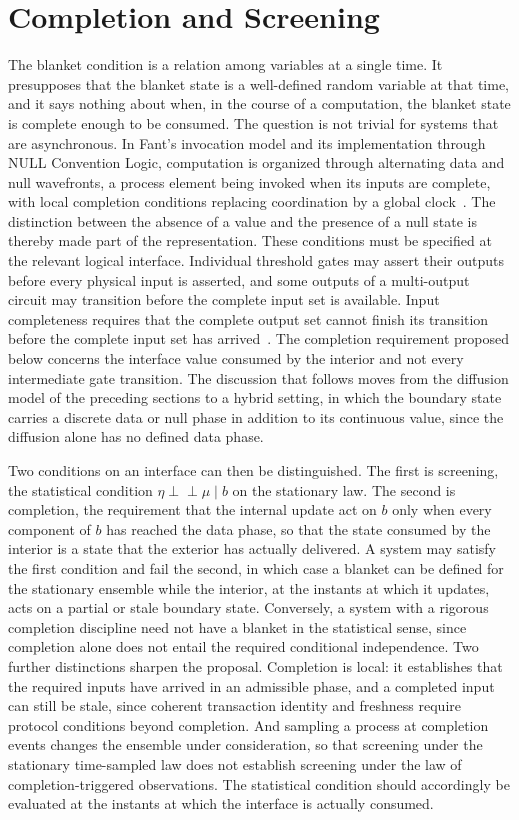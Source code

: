 \documentclass[11pt]{article}
\theoremstyle{definition}
\newcommand{\Ind}{\perp\!\!\!\perp}
\begin{document}
\section{Completion and Screening}

The blanket condition is a relation among variables at a single time. It presupposes that the blanket state is a well-defined random variable at that time, and it says nothing about when, in the course of a computation, the blanket state is complete enough to be consumed. The question is not trivial for systems that are asynchronous. In Fant's invocation model and its implementation through NULL Convention Logic, computation is organized through alternating data and null wavefronts, a process element being invoked when its inputs are complete, with local completion conditions replacing coordination by a global clock~\cite{fant2005,fant2007}. The distinction between the absence of a value and the presence of a null state is thereby made part of the representation. These conditions must be specified at the relevant logical interface. Individual threshold gates may assert their outputs before every physical input is asserted, and some outputs of a multi-output circuit may transition before the complete input set is available. Input completeness requires that the complete output set cannot finish its transition before the complete input set has arrived~\cite[Section~2.2, p.~174]{ponugoti2022}. The completion requirement proposed below concerns the interface value consumed by the interior and not every intermediate gate transition. The discussion that follows moves from the diffusion model of the preceding sections to a hybrid setting, in which the boundary state carries a discrete data or null phase in addition to its continuous value, since the diffusion alone has no defined data phase.

Two conditions on an interface can then be distinguished. The first is screening, the statistical condition $\eta\Ind\mu\mid b$ on the stationary law. The second is completion, the requirement that the internal update act on $b$ only when every component of $b$ has reached the data phase, so that the state consumed by the interior is a state that the exterior has actually delivered. A system may satisfy the first condition and fail the second, in which case a blanket can be defined for the stationary ensemble while the interior, at the instants at which it updates, acts on a partial or stale boundary state. Conversely, a system with a rigorous completion discipline need not have a blanket in the statistical sense, since completion alone does not entail the required conditional independence. Two further distinctions sharpen the proposal. Completion is local: it establishes that the required inputs have arrived in an admissible phase, and a completed input can still be stale, since coherent transaction identity and freshness require protocol conditions beyond completion. And sampling a process at completion events changes the ensemble under consideration, so that screening under the stationary time-sampled law does not establish screening under the law of completion-triggered observations. The statistical condition should accordingly be evaluated at the instants at which the interface is actually consumed.
\end{document}
